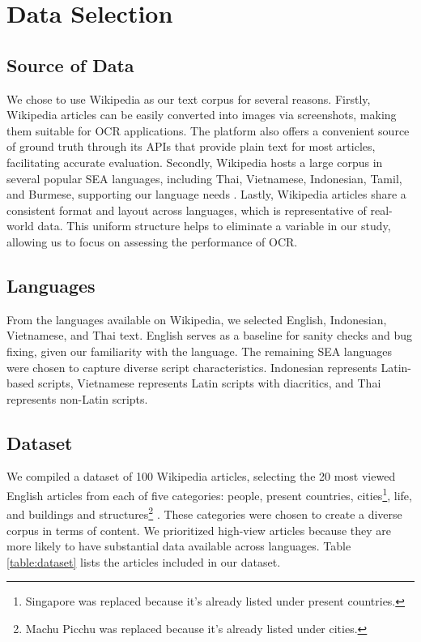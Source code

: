 \documentclass[12pt,oneside]{memoir}
\begin{document}
\section{Data Selection}

\subsection{Source of Data}
We chose to use Wikipedia as our text corpus for several reasons.
Firstly, Wikipedia articles can be easily converted into images via screenshots, making them suitable for OCR applications. 
The platform also offers a convenient source of ground truth through its APIs that provide plain text for most articles, facilitating accurate evaluation. 
Secondly, Wikipedia hosts a large corpus in several popular SEA languages, including Thai, Vietnamese, Indonesian, Tamil, and Burmese, supporting our language needs \parencite{list-of-wikipedias-2024}. 
Lastly, Wikipedia articles share a consistent format and layout across languages, which is representative of real-world data. 
This uniform structure helps to eliminate a variable in our study, allowing us to focus on assessing the performance of OCR.

\subsection{Languages}
From the languages available on Wikipedia, we selected English, Indonesian, Vietnamese, and Thai text. 
English serves as a baseline for sanity checks and bug fixing, given our familiarity with the language. 
The remaining SEA languages were chosen to capture diverse script characteristics. 
Indonesian represents Latin-based scripts, Vietnamese represents Latin scripts with diacritics, and Thai represents non-Latin scripts. 

\subsection{Dataset}
We compiled a dataset of 100 Wikipedia articles, selecting the 20 most viewed English articles from each of five categories: people, present countries, cities\footnote{ Singapore was replaced because it's already listed under present countries.}, life, and buildings and structures\footnote{ Machu Picchu was replaced because it's already listed under cities.} \parencite{wikipedia-popular-pages-2024}.
These categories were chosen to create a diverse corpus in terms of content. 
We prioritized high-view articles because they are more likely to have substantial data available across languages. 
Table \ref{table:dataset} lists the articles included in our dataset.
\end{document}
